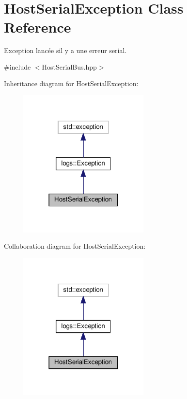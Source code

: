 \hypertarget{classHostSerialException}{}\section{Host\+Serial\+Exception Class Reference}
\label{classHostSerialException}


Exception lancée s\textquotesingle{}il y a une erreur serial.  




{\ttfamily \#include $<$Host\+Serial\+Bus.\+hpp$>$}



Inheritance diagram for Host\+Serial\+Exception\+:
\nopagebreak
\begin{figure}[H]
\begin{center}
\leavevmode
\includegraphics[width=186pt]{classHostSerialException__inherit__graph}
\end{center}
\end{figure}


Collaboration diagram for Host\+Serial\+Exception\+:
\nopagebreak
\begin{figure}[H]
\begin{center}
\leavevmode
\includegraphics[width=186pt]{classHostSerialException__coll__graph}
\end{center}
\end{figure}
